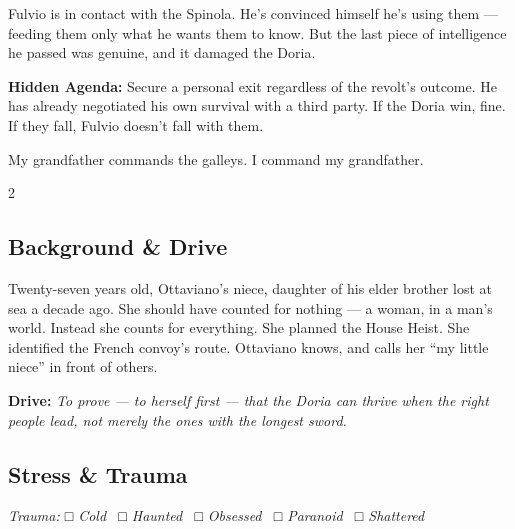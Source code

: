 \begin{secretbox}
Fulvio is in contact with the Spinola. He's convinced himself he's using
them --- feeding them only what he wants them to know. But the last
piece of intelligence he passed was genuine, and it damaged the Doria.

\medskip
\textbf{\textcolor{SecretRed}{Hidden Agenda:}} Secure a personal exit regardless of the revolt's
outcome. He has already negotiated his own survival with a third party.
If the Doria win, fine. If they fall, Fulvio doesn't fall with them.
\end{secretbox}

\newpage


%
  {My grandfather commands the galleys. I command my grandfather.}

\begin{multicols}{2}
\subsection*{Background \& Drive}
Twenty-seven years old, Ottaviano's niece, daughter of his elder brother
lost at sea a decade ago. She should have counted for nothing --- a woman,
in a man's world. Instead she counts for everything. She planned the House
Heist. She identified the French convoy's route. Ottaviano knows, and
calls her ``my little niece'' in front of others.

\textbf{\textcolor{DoriaBlue}{Drive:}} \textit{To prove --- to herself
first --- that the Doria can thrive when the right people lead,
not merely the ones with the longest sword.}
\columnbreak
\subsection*{Stress \& Trauma}
\textit{\small Trauma: □ Cold \ □ Haunted \ □ Obsessed \ □ Paranoid \ □ Shattered}
\end{multicols}

